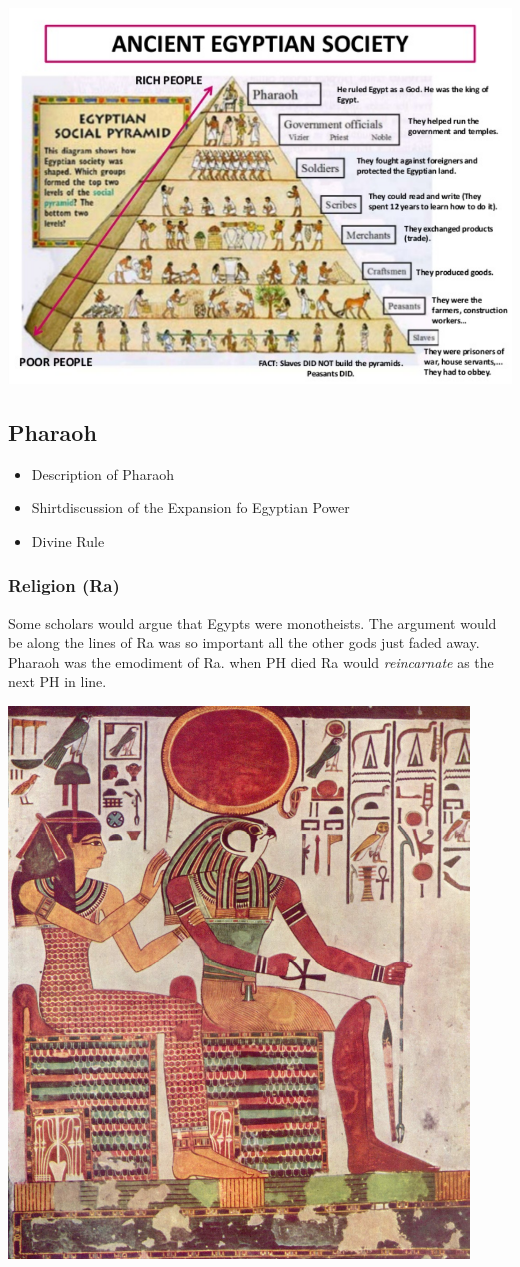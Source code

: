 \documentclass[11pt]{article}
\begin{document}
\includegraphics[width=.9\linewidth]{img/egyptExpsoc.png}

\subsection{Pharaoh}
\label{sec-4-8}
\begin{itemize}
\item Description of Pharaoh
\item Shirtdiscussion of the Expansion fo Egyptian Power
\item Divine Rule
\end{itemize}
\subsubsection{Religion (Ra)}
\label{sec-4-8-1}
Some scholars would argue that Egypts were monotheists. The argument would be along the lines of Ra was so important all the other gods just faded away.
Pharaoh was the emodiment of Ra. when PH died Ra would \emph{reincarnate} as the next PH in line.

\includegraphics[width=.9\linewidth]{img/PHegRA.png}
\end{document}
